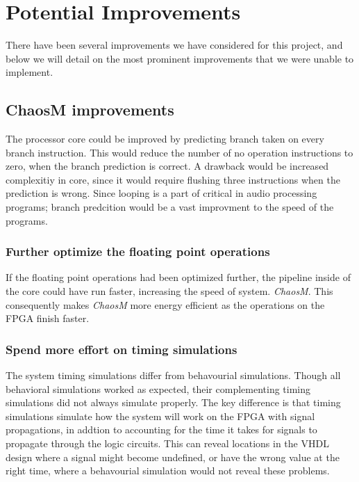 \section{Potential Improvements}

There have been several improvements we have considered for this project, and
below we will detail on the most prominent improvements that we were unable to
implement.

\subsection{ChaosM improvements}

The processor core could be improved by predicting branch taken on every branch instruction. This would reduce 
the number of no operation instructions to zero, when the branch prediction is correct. A drawback would be increased 
complexitiy in core, since it would require flushing three instructions when the prediction is wrong. Since looping is
a part of critical in audio processing programs; branch predcition would be a vast improvment to the speed of the programs. 
\subsubsection{Further optimize the floating point operations}

If the floating point operations had been optimized further, the pipeline inside
of the core could have run faster, increasing the speed of system.
\textit{ChaosM}. This consequently makes \textit{ChaosM} more energy efficient as the operations on the FPGA finish faster.

\subsubsection{Spend more effort on timing simulations}

The system timing simulations differ from behavourial simulations. Though all behavioral 
simulations worked as expected, their complementing timing simulations did 
not always simulate properly.
The key difference is that timing simulations simulate how the system will work
on the FPGA with signal propagations, in addtion to accounting for the time it
takes for signals to propagate through the logic circuits. This can reveal
locations in the VHDL design where a signal might become undefined, or have the
wrong value at the right time, where a behavourial simulation would not reveal
these problems. 

